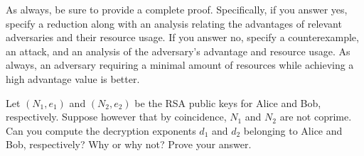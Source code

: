 \documentclass{exam}
\begin{document}
\begin{questions}
  As always, be sure to provide a complete proof. Specifically, if you answer yes, specify a reduction along with an analysis relating the advantages of relevant adversaries and their resource usage. If you answer no, specify a counterexample, an attack, and an analysis of the adversary's advantage and resource usage. As always, an adversary requiring a minimal amount of resources while achieving a high advantage value is better.  
  

  \question Let $(N_1, e_1)$ and $(N_2, e_2)$ be the RSA public keys for Alice and Bob, respectively. Suppose however that by coincidence, $N_1$ and $N_2$ are not coprime. Can you compute the decryption exponents $d_1$ and $d_2$ belonging to Alice and Bob, respectively? Why or why not? Prove your answer.

  
\end{questions}
\end{document}

